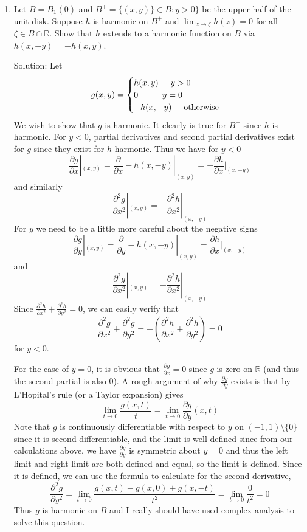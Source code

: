 \documentclass[11pt]{article}
\newcommand{\R}{\mathbb{R}}
\begin{document}
\begin{enumerate}[(1)]
\item Let $B = B_1(0)$ and $B^+ = \{(x, y)\} \in B: y > 0\}$ be the upper half of the unit disk. Suppose $h$ is harmonic on $B^+$ and $\lim_{z\to\zeta} h(z) = 0$ for all $\zeta \in B \cap \R$. Show that $h$ extends to a harmonic function on $B$ via $h(x, -y) = - h(x,y)$.

Solution: Let 
$$ g(x,y) = \begin{cases} 
h(x, y) \hspace{5mm} y > 0 \\
0 \hspace{10mm} y = 0 \\
-h(x, -y) \hspace{5mm} \text{otherwise}
\end{cases} $$
We wish to show that $g$ is harmonic. It clearly is true for $B^+$ since $h$ is harmonic. For $y < 0$, partial derivatives and second partial derivatives exist for $g$ since they exist for $h$ harmonic. Thus we have for $y < 0$
$$ \frac{\partial g}{\partial x}|_{(x, y)} = \frac{\partial}{\partial x} -h(x, -y) | _{(x, y)} = -\frac{\partial h}{\partial x}|_{(x, -y)}$$
and similarly
$$ \frac{\partial^2 g}{\partial x^2}|_{(x, y)} = - \frac{\partial^2 h}{\partial x^2}|_{(x, -y)} $$
For $y$ we need to be a little more careful about the negative signs
$$ \frac{\partial g}{\partial y}|_{(x, y)} = \frac{\partial}{\partial y} -h(x, -y) | _{(x, y)} = \frac{\partial h}{\partial x}|_{(x, -y)}$$
and 
$$ \frac{\partial^2 g}{\partial x^2}|_{(x, y)} = - \frac{\partial^2 h}{\partial x^2}|_{(x, -y)} $$
Since $\frac{\partial^2 h}{\partial x^2} + \frac{\partial^2 h}{\partial y^2} = 0$, we can easily verify that 
$$ \frac{\partial^2 g}{\partial x^2} + \frac{\partial^2 g}{\partial y^2} = -\left( \frac{\partial^2 h}{\partial x^2} + \frac{\partial^2 h}{\partial y^2} \right) = 0 $$
for $y < 0$. 

For the case of $y=0$, it is obvious that $\frac{\partial g}{\partial x} = 0$ since $g$ is zero on $\R$ (and thus the second partial is also 0). A rough argument of why $\frac{\partial g}{\partial y}$ exists is that by L'Hopital's rule (or a Taylor expansion) gives 
$$ \lim_{t \to 0} \frac{g(x, t)}{t} = \lim_{t \to 0} \frac{\partial g}{\partial y} (x, t) $$
Note that $g$ is continuously differentiable with respect to $y$ on $(-1, 1) \setminus \{ 0 \}$ since it is second differentiable, and the limit is well defined since from our calculations above, we have $\frac{\partial g}{\partial y}$ is symmetric about $y = 0$ and thus the left limit and right limit are both defined and equal, so the limit is defined. Since it is defined, we can use the formula to calculate for the second derivative,
$$ \frac{\partial^2 g}{\partial y^2} = \lim_{t \to 0} \frac{ g(x, t) - g(x,0) + g(x, -t)}{t^2} = \lim_{t \to 0} \frac{0}{t^2} = 0 $$
Thus $g$ is harmonic on $B$ and I really should have used complex analysis to solve this question.


\end{enumerate}
\end{document}
